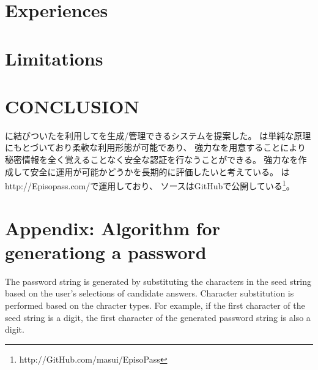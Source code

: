 \documentclass{article}
\begin{document}
\section{Experiences}

\section{Limitations}

% 

\section{CONCLUSION}

{\EM}に結びついた{\SQ}を利用して{\PW}を生成/管理できるシステム{\EP}を提案した。
{\EP}は単純な原理にもとづいており柔軟な利用形態が可能であり、
強力な{\SQ}を用意することにより
秘密情報を全く覚えることなく安全な認証を行なうことができる。
%
強力な{\SQ}を作成して安全に運用が可能かどうかを長期的に評価したいと考えている。
%
%
{\EP}は\textsf{http://Episopass.com/}で運用しており、
ソースはGitHubで公開している\footnote{
  \textsf{http://GitHub.com/masui/EpisoPass}
}。

{%


}

\section*{Appendix: Algorithm for generationg a password}



The password string is generated by
substituting the characters in the seed string
based on the user's selections of candidate answers.
Character substitution is performed based on the chracter types.
For example, if the first character of the seed string is a digit,
the first character of the generated password string is also a digit.
\end{document}
